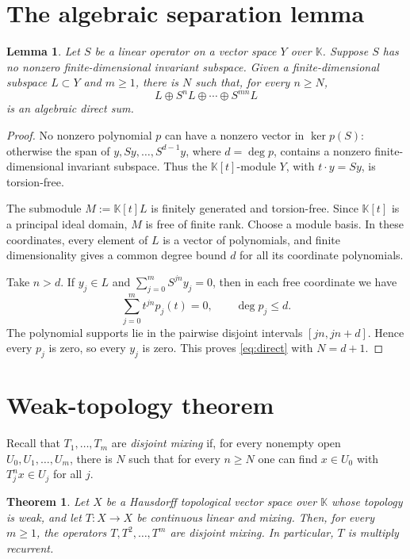 \documentclass[11pt]{article}
\newtheorem{theorem}{Theorem}
\newtheorem{lemma}{Lemma}
\newcommand{\K}{\mathbb K}
\begin{document}
\section{The algebraic separation lemma}

\begin{lemma}\label{lem:blocks}
Let $S$ be a linear operator on a vector space $Y$ over $\K$.  Suppose $S$ has
no nonzero finite-dimensional invariant subspace.  Given a finite-dimensional
subspace $L\subset Y$ and $m\ge1$, there is $N$ such that, for every $n\ge N$,
\[
 L\oplus S^nL\oplus\cdots\oplus S^{mn}L
\tag{1}\label{eq:direct}
\]
is an algebraic direct sum.
\end{lemma}

\begin{proof}
No nonzero polynomial $p$ can have a nonzero vector in $\ker p(S)$: otherwise
the span of $y,Sy,\ldots,S^{d-1}y$, where $d=\deg p$, contains a nonzero
finite-dimensional invariant subspace.  Thus the $\K[t]$-module $Y$, with
$t\cdot y=Sy$, is torsion-free.

The submodule $M:=\K[t]L$ is finitely generated and torsion-free.  Since
$\K[t]$ is a principal ideal domain, $M$ is free of finite rank.  Choose a
module basis.  In these coordinates, every element of $L$ is a vector of
polynomials, and finite dimensionality gives a common degree bound $d$ for
all its coordinate polynomials.

Take $n>d$.  If $y_j\in L$ and
$\sum_{j=0}^m S^{jn}y_j=0$, then in each free coordinate we have
\[
 \sum_{j=0}^m t^{jn}p_j(t)=0,
 \qquad \deg p_j\le d.
\]
The polynomial supports lie in the pairwise disjoint intervals
$[jn,jn+d]$.  Hence every $p_j$ is zero, so every $y_j$ is zero.  This proves
\eqref{eq:direct} with $N=d+1$.
\end{proof}

\section{Weak-topology theorem}

Recall that $T_1,\ldots,T_m$ are \emph{disjoint mixing} if, for every
nonempty open $U_0,U_1,\ldots,U_m$, there is $N$ such that for every $n\ge N$
one can find $x\in U_0$ with $T_j^nx\in U_j$ for all $j$.

\begin{theorem}\label{thm:main}
Let $X$ be a Hausdorff topological vector space over $\K$ whose topology is
weak, and let $T:X\to X$ be continuous linear and mixing.  Then, for every
$m\ge1$, the operators $T,T^2,\ldots,T^m$ are disjoint mixing.  In
particular, $T$ is multiply recurrent.
\end{theorem}
\end{document}
